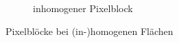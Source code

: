 \begin{figure}[H]
\begin{subfigure}[b]{0.4\textwidth}
        \label{fig:Inhomogener Pixelblock}
        \caption{inhomogener Pixelblock}
    \end{subfigure}

    \caption{Pixelblöcke bei (in-)homogenen Flächen}\label{fig:Pixelblöcke}
\end{figure}